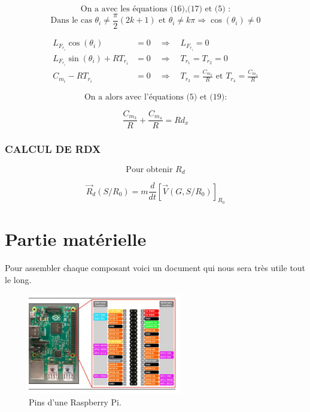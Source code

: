 \documentclass[a4paper,12pt]{report}  %
\begin{document}
$$
\text{On a avec les équations (16),(17) et (5) :}
$$
$$
\text{Dans le cas } \theta_i \neq \frac{\pi}{2}(2k+1)\text{ et } \theta_i \neq k\pi 
\Rightarrow \cos(\theta_i) \neq 0
$$


\begin{align}
	L_{F_{r_i}} \cos(\theta_i) &= 0 \quad \Rightarrow \quad L_{F_{r_i}} = 0 \\
	L_{F_{r_i}} \sin(\theta_i) + R T_{r_i} &= 0 \quad \Rightarrow \quad T_{r_1} = T_{r_2} = 0 \\
	C_{m_i} - R T_{r_i} &= 0 \quad \Rightarrow \quad T_{r_3} = \frac{C_{m_3}}{R} \text{ et } T_{r_4} = \frac{C_{m_4}}{R}
\end{align}

$$
\text{On a alors avec l'équations (5) et (19):}
$$


$$
\frac{C_{m_3}}{R} + \frac{C_{m_4}}{R} = Rd_x 
$$






\subsubsection{CALCUL DE RDX}

$$
\text{Pour obtenir } R_d
$$

$$
\vec{R}_d(S/R_0) = m \frac{d}{dt} [ \vec{V}(G,S/R_0) ]_{R_0}
$$





\pagebreak


\section{Partie matérielle}
Pour assembler chaque composant voici un document qui nous sera très utile tout le long. 

\begin{figure}[H]
	\centering
	\includegraphics[width=0.6\textwidth]{./attachments/raspberry_pi_pin_map.jpg}
	\caption{Pins d'une Raspberry Pi. }
\end{figure}
\end{document}
